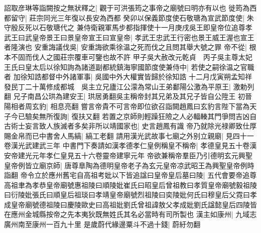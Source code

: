 詔取彦琳等詣闕按之無狀釋之|{
	觀于可洪張筠之事帝之廟號曰明亦有以也}
徙筠為西都留守|{
	莊宗同光三年復以長安為西都}
癸卯以保義節度使石敬瑭為宣武節度使|{
	朱守殷反死以石敬瑭代之}
兼侍衛親軍馬步都指揮使十一月庚戌吳王即皇帝位追尊孝武王曰武皇帝景王曰景皇帝宣王曰宣皇帝|{
	孝武王忠武王行密也景王威王渥也宣王者隆演也}
安重誨議伐吳|{
	安重誨欲乘徐温之死而伐之且問其舉大號之罪}
帝不從|{
	根本不固而伐人之國莊宗覆車可鑒也故不許}
甲子吳大赦改元乾貞　丙子吳主尊太妃王氏曰皇太后以徐知詢為諸道副都統鎮海寧國節度使兼侍中|{
	若使之嗣徐温之官職者}
加徐知誥都督中外諸軍事|{
	吳國中外大權實皆歸於徐知誥}
十二月戊寅朔孟知祥發民丁二十萬修成都城　吳主立兄廬江公濛為常山王弟鄱陽公激為平原王|{
	激勅列翻}
兄子南昌公珙為建安王|{
	珙居勇翻吳主稱帝封其兄弟及其兄子皆自公陞王}
初晉陽相者周玄豹|{
	相息亮翻}
嘗言帝貴不可言帝即位欲召詣闕趙鳳曰玄豹言陛下當為天子今已驗矣無所復詢|{
	復扶又翻}
若置之京師則輕躁狂險之人必輻輳其門爭問吉凶自古術士妄言致人族滅者多矣非所以靖國家也|{
	史言趙鳳有識}
帝乃就除光禄卿致仕厚賜金帛而已中書舍人馬縞|{
	縞工老翻}
請用漢光武故事七廟之外别立親廟|{
	見四十一卷漢光武建武三年}
中書門下奏請如漢孝德孝仁皇例稱皇不稱帝|{
	孝德皇見五十卷漢安帝建光元年孝仁皇見五十六卷靈帝建寧元年}
帝欲兼稱帝羣臣乃引德明玄元興聖皇帝例皆立廟京師|{
	唐尊臯陶為德明皇帝老子為玄元皇帝凉武昭王為興聖皇帝例時詣翻}
帝令立於應州舊宅自高祖考妣以下皆追諡曰皇帝皇后墓曰陵|{
	五代會要帝追尊高祖聿為孝恭皇帝廟號惠祖陵曰順陵妣崔氏曰昭皇后曾祖教曰孝質皇帝廟號毅祖陵曰衍陵妣張氏曰順皇后祖琰曰孝靖皇帝廟號烈祖陵曰奕陵妣何氏曰穆皇后父霓曰孝成皇帝廟號德祖陵曰慶陵歐史曰高祖妣劉氏曾祖諱敖父孝成妣劉氏諡懿皇后四陵皆在應州金城縣按帝之先本夷狄既無姓氏其名必當時有司所製也}
漢主如康州|{
	九域志廣州南至康州一百九十里}
是歲蔚代緣邊粟斗不過十錢|{
	蔚紆勿翻}


